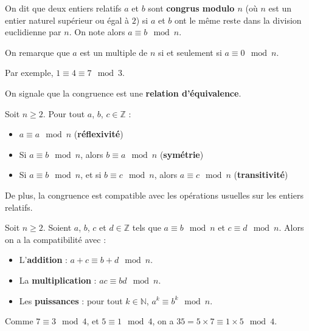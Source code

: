 	\begin{formula}[Définition]
		On dit que deux entiers relatifs $a$ et $b$ sont \textbf{congrus modulo $n$} (où $n$ est un entier naturel supérieur ou égal à $2$) si $a$ et $b$ ont le même reste dans la division euclidienne par $n$. On note alors $a \equiv b \mod n$.
	\end{formula}
	
	\begin{tip}
		On remarque que $a$ est un multiple de $n$ si et seulement si $a \equiv 0 \mod n$.
	\end{tip}
	
	\begin{tip}[Exemple]
		Par exemple, $1 \equiv 4 \equiv 7 \mod 3$.
	\end{tip}
	
	On signale que la congruence est une \textbf{relation d'équivalence}.
	
	\begin{formula}[Propriétés]
		Soit $n \geq 2$. Pour tout $a$, $b$, $c \in \mathbb{Z}$ :
		\begin{itemize}
			\item $a \equiv a \mod n$ (\textbf{réflexivité})
			\item Si $a \equiv b \mod n$, alors $b \equiv a \mod n$ (\textbf{symétrie})
			\item Si $a \equiv b \mod n$, et si $b \equiv c \mod n$, alors $a \equiv c \mod n$ (\textbf{transitivité})
		\end{itemize}
	\end{formula}
	
	De plus, la congruence est compatible avec les opérations usuelles sur les entiers relatifs.
	
	\begin{formula}[Propriétés]
		Soit $n \geq 2$. Soient $a$, $b$, $c$ et $d \in \mathbb{Z}$ tels que $a \equiv b \mod n$ et $c \equiv d \mod n$. Alors on a la compatibilité avec :
		\begin{itemize}
			\item L'\textbf{addition} : $a + c \equiv b + d \mod n$.
			\item La \textbf{multiplication} : $ac \equiv bd \mod n$.
			\item Les \textbf{puissances} : pour tout $k \in \mathbb{N}$, $a^k \equiv b^k \mod n$.
		\end{itemize}
	\end{formula}
	
	\begin{tip}[Exemple]
		Comme $7 \equiv 3 \mod 4$, et $5 \equiv 1 \mod 4$, on a $35 = 5 \times 7 \equiv 1 \times 5 \mod 4$.
	\end{tip}
	
